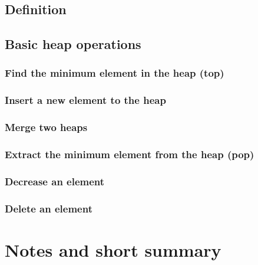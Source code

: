 \documentclass{article}
\begin{document}
\subsection{Definition}

\subsection{Basic heap operations}

\subsubsection{Find the minimum element in the heap (top)}

\subsubsection{Insert a new element to the heap}

\subsubsection{Merge two heaps}

\subsubsection{Extract the minimum element from the heap (pop)}

\subsubsection{Decrease an element}

\subsubsection{Delete an element}

\section{Notes and short summary}
\end{document}
